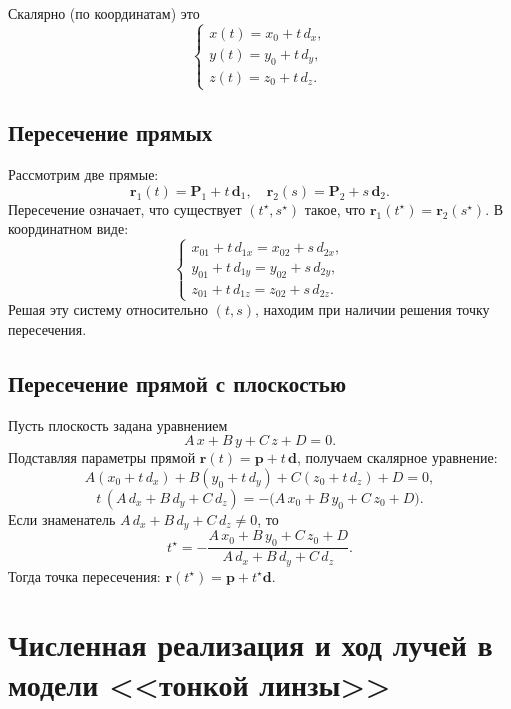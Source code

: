 \documentclass[a4paper,12pt]{article}
\begin{document}
Скалярно (по координатам) это
\[
  \begin{cases}
    x(t) = x_0 + t\,d_x, \\
    y(t) = y_0 + t\,d_y, \\
    z(t) = z_0 + t\,d_z.
  \end{cases}
\]

\subsection{Пересечение прямых}

Рассмотрим две прямые:
\[
  \mathbf{r}_1(t) = \mathbf{P}_1 + t\,\mathbf{d}_1, 
  \quad
  \mathbf{r}_2(s) = \mathbf{P}_2 + s\,\mathbf{d}_2.
\]
Пересечение означает, что существует $(t^{\star}, s^{\star})$ такое, что 
\(
  \mathbf{r}_1(t^{\star}) = \mathbf{r}_2(s^{\star}).
\)
В координатном виде:
\[
  \begin{cases}
  x_{01} + t\,d_{1x} = x_{02} + s\,d_{2x},\\
  y_{01} + t\,d_{1y} = y_{02} + s\,d_{2y},\\
  z_{01} + t\,d_{1z} = z_{02} + s\,d_{2z}.
  \end{cases}
\]
Решая эту систему относительно $(t,s)$, находим при наличии решения точку пересечения.

\subsection{Пересечение прямой с плоскостью}

Пусть плоскость задана уравнением
\[
  A\,x + B\,y + C\,z + D = 0.
\]
Подставляя параметры прямой $\mathbf{r}(t) = \mathbf{p} + t\,\mathbf{d}$, получаем скалярное уравнение:
\[
  A(x_0 + t\,d_x) + B(y_0 + t\,d_y) + C(z_0 + t\,d_z) + D = 0,
\]
\[
  t\,(A\,d_x + B\,d_y + C\,d_z) = - \bigl(A\,x_0 + B\,y_0 + C\,z_0 + D\bigr).
\]
Если знаменатель $A\,d_x + B\,d_y + C\,d_z\neq 0$, то
\[
  t^{\star} = -\frac{A\,x_0 + B\,y_0 + C\,z_0 + D}{A\,d_x + B\,d_y + C\,d_z}.
\]
Тогда точка пересечения: 
\(
  \mathbf{r}(t^{\star})=\mathbf{p}+ t^{\star}\mathbf{d}.
\)

\section{Численная реализация и ход лучей в модели <<тонкой линзы>>}
\end{document}
